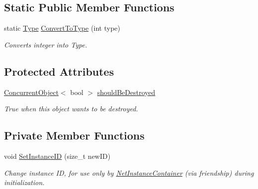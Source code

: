 \subsection*{Static Public Member Functions}
\begin{DoxyCompactItemize}
\item 
static \hyperlink{class_net_instance_a0ec01a76d9b78794cfbdeab10a436cdc}{Type} \hyperlink{class_net_instance_a045180c582af2f076774958142b5f5bb}{ConvertToType} (int type)
\begin{DoxyCompactList}\small\item\em Converts integer into Type. \item\end{DoxyCompactList}\end{DoxyCompactItemize}
\subsection*{Protected Attributes}
\begin{DoxyCompactItemize}
\item 
\hypertarget{class_net_instance_a76e5bc2ba84bf43b8bbc23a3a9031d7d}{
\hyperlink{class_concurrent_object}{ConcurrentObject}$<$ bool $>$ \hyperlink{class_net_instance_a76e5bc2ba84bf43b8bbc23a3a9031d7d}{shouldBeDestroyed}}
\label{class_net_instance_a76e5bc2ba84bf43b8bbc23a3a9031d7d}

\begin{DoxyCompactList}\small\item\em True when this object wants to be destroyed. \item\end{DoxyCompactList}\end{DoxyCompactItemize}
\subsection*{Private Member Functions}
\begin{DoxyCompactItemize}
\item 
void \hyperlink{class_net_instance_aecf5ccfc0448e938cfb2bb1387725393}{SetInstanceID} (size\_\-t newID)
\begin{DoxyCompactList}\small\item\em Change instance ID, for use only by \hyperlink{class_net_instance_container}{NetInstanceContainer} (via friendship) during initialization. \item\end{DoxyCompactList}\end{DoxyCompactItemize}
